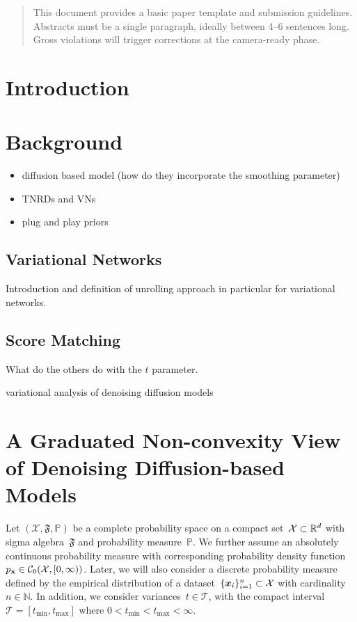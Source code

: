 \documentclass[nohyperref]{article}
\newcommand{\N}{\mathbb{N}}
\renewcommand{\P}{\mathbb{P}}
\newcommand{\C}{\mathcal{C}}
\newcommand{\X}{\mathcal{X}}
\newcommand{\T}{\mathcal{T}}
\newcommand{\tmin}{t_\mathrm{min}}
\newcommand{\tmax}{t_\mathrm{max}}
\newcommand{\pdf}[1]{p_{#1}}
\theoremstyle{plain}
\theoremstyle{definition}
\theoremstyle{remark}
\begin{document}
\printAffiliationsAndNotice{\icmlEqualContribution} %

\begin{abstract}
This document provides a basic paper template and submission guidelines.
Abstracts must be a single paragraph, ideally between 4--6 sentences long.
Gross violations will trigger corrections at the camera-ready phase.
\end{abstract}

\section{Introduction}

\section{Background}

\begin{itemize}
    \item diffusion based model (how do they incorporate the smoothing parameter)
    \item TNRDs and VNs
    \item plug and play priors
\end{itemize}

\subsection{Variational Networks}
Introduction and definition of unrolling approach in particular for variational networks.

\subsection{Score Matching}

What do the others do with the $t$ parameter.

variational analysis of denoising diffusion models~\cite{HuLi21}

\section{A Graduated Non-convexity View of Denoising Diffusion-based Models} \label{sec:gnc}
Let $(\X,\mathfrak{F},\P)$ be a complete probability space on a compact set~$\X\subset\R^d$ with sigma algebra~$\mathfrak{F}$ and probability measure~$\P$.
We further assume an absolutely continuous probability measure with corresponding probability density function~$\pdf{\rvx}\in \C_0(\X,[0,\infty))$.
Later, we will also consider a discrete probability measure defined by the empirical distribution of a dataset~$\{\vx_i\}_{i=1}^n\subset\X$ with cardinality~$n\in\N$.
In addition, we consider variances~$t\in\T$, with the compact interval~$\T=[\tmin,\tmax]$ where $0<\tmin<\tmax<\infty$.
\end{document}
